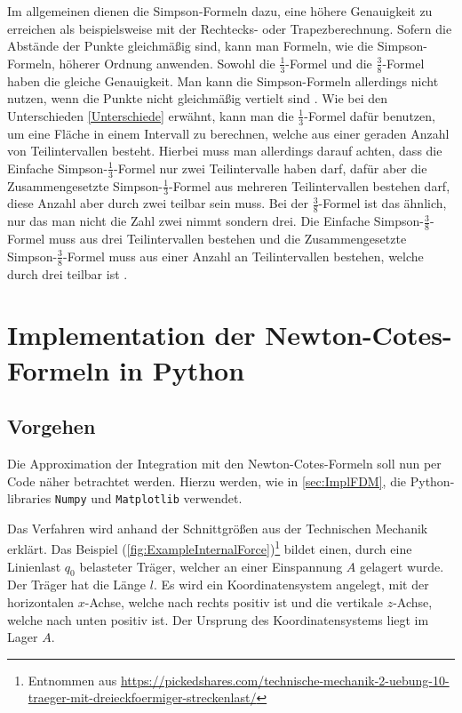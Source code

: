 Im allgemeinen dienen die Simpson-Formeln dazu, eine höhere Genauigkeit zu erreichen als beispielsweise mit der Rechtecks- oder Trapezberechnung. \textsc{\cite[S. 310]{NumMathe}} Sofern die Abstände der Punkte gleichmäßig sind, kann man Formeln, wie die Simpson-Formeln, höherer Ordnung anwenden. Sowohl die \(\frac{1}{3}\)-Formel und die \(\frac{3}{8}\)-Formel haben die gleiche Genauigkeit. Man kann die Simpson-Formeln allerdings nicht nutzen, wenn die Punkte nicht gleichmäßig vertielt sind \textsc{\cite[S. 186]{NumMethodsScienceEng}}. Wie bei den Unterschieden \ref{Unterschiede} erwähnt, kann man die \(\frac{1}{3}\)-Formel dafür benutzen, um eine Fläche in einem Intervall zu berechnen, welche aus einer geraden Anzahl von Teilintervallen besteht. Hierbei muss man allerdings darauf achten, dass die Einfache Simpson-\(\frac{1}{3}\)-Formel nur zwei Teilintervalle haben darf, dafür aber die Zusammengesetzte Simpson-\(\frac{1}{3}\)-Formel aus mehreren Teilintervallen bestehen darf, diese Anzahl aber durch zwei teilbar sein muss. Bei der \(\frac{3}{8}\)-Formel ist das ähnlich, nur das man nicht die Zahl zwei nimmt sondern drei. Die Einfache Simpson-\(\frac{3}{8}\)-Formel muss aus drei Teilintervallen bestehen und die Zusammengesetzte Simpson-\(\frac{3}{8}\)-Formel muss aus einer Anzahl an Teilintervallen bestehen, welche durch drei teilbar ist \textsc{\cite[S. 180]{NumMethodsScienceEng}} \textsc{\cite[S. 186]{NumMethodsScienceEng}}. 

\section{Implementation der Newton-Cotes-Formeln in Python}

\subsection{Vorgehen}
Die Approximation der Integration mit den Newton-Cotes-Formeln soll nun per Code näher betrachtet werden. Hierzu werden, wie in \ref{sec:ImplFDM}, die Python-libraries \texttt{Numpy} und \texttt{Matplotlib} verwendet.

Das Verfahren wird anhand der Schnittgrößen aus der Technischen Mechanik erklärt. Das Beispiel (\ref{fig:ExampleInternalForce})\footnote{Entnommen aus \href{https://pickedshares.com/technische-mechanik-2-uebung-10-traeger-mit-dreieckfoermiger-streckenlast/}{https://pickedshares.com/technische-mechanik-2-uebung-10-traeger-mit-dreieckfoermiger-streckenlast/}} bildet einen, durch eine Linienlast $q_0$ belasteter Träger, welcher an einer Einspannung $A$ gelagert wurde. Der Träger hat die Länge $l$. Es wird ein Koordinatensystem angelegt, mit der horizontalen $x$-Achse, welche nach rechts positiv ist und die vertikale $z$-Achse, welche nach unten positiv ist. Der Ursprung des Koordinatensystems liegt im Lager $A$.

